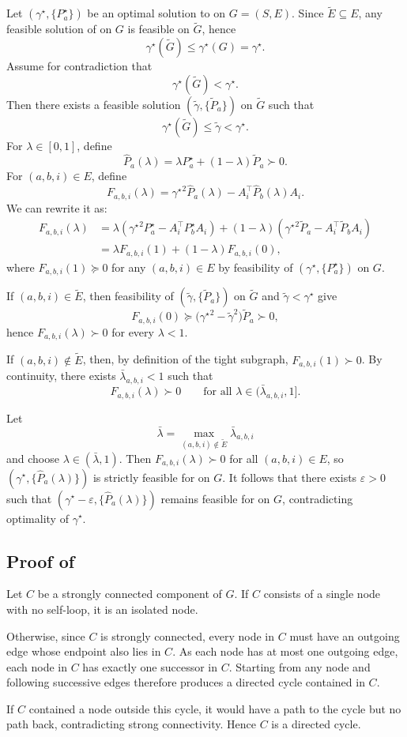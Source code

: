 \documentclass[letterpaper, 10 pt, conference]{ieeeconf}  %
\begin{document}
Let $(\gamma^\star,\{P_a^\star\})$ be an optimal solution to
 on $G=(S,E)$. Since $\tilde E\subseteq E$, any feasible
solution of  on $G$ is feasible on $\tilde G$, hence
\[
\gamma^\star(\tilde G)\leq\gamma^\star(G)=\gamma^\star.
\]
Assume for contradiction that
\[
\gamma^\star(\tilde G)<\gamma^\star.
\]
Then there exists a feasible solution
$(\tilde\gamma,\{\tilde P_a\})$ on $\tilde G$ such that
\[
\gamma^\star(\tilde G)\leq\tilde\gamma<\gamma^\star.
\]
For $\lambda\in[0,1]$, define
\[
\hat P_a(\lambda)=\lambda P_a^\star +(1-\lambda)\tilde P_a \succ 0.
\]
For $(a,b,i)\in E$, define
\[
F_{a,b,i}(\lambda)=
{\gamma^\star}^2 \hat P_a(\lambda)-A_i^\top\hat P_b(\lambda)A_i .
\]
We can rewrite it as:
\begin{align*}
F_{a,b,i}(\lambda)&=\lambda\left({\gamma^\star}^2 P_a^\star-A_i^\top P_b^\star A_i \right)+\left(1-\lambda\right)\left( {\gamma^\star}^2 \tilde P_a-A_i^\top\tilde P_b A_i \right)\\
&=\lambda F_{a,b,i}(1)+(1-\lambda)F_{a,b,i}(0),
\end{align*}
where $F_{a,b,i}(1)
\succeq0$ for any $(a,b,i)\in E$ by feasibility of $(\gamma^\star,\{P_a^\star\})$ on $G$.

If $(a,b,i)\in\tilde E$, then feasibility of
$(\tilde\gamma,\{\tilde P_a\})$ on $\tilde G$ and $\tilde\gamma<\gamma^\star$ give
\[
F_{a,b,i}(0)
\succeq
\bigl({\gamma^\star}^2-\tilde\gamma^2\bigr)\tilde P_a
\succ0,
\]
hence $F_{a,b,i}(\lambda)\succ0$ for every $\lambda<1$.

If $(a,b,i)\notin\tilde E$, then, by definition of the tight subgraph,
$F_{a,b,i}(1)\succ0$. By continuity, there exists
$\bar\lambda_{a,b,i}<1$ such that
\[
F_{a,b,i}(\lambda)\succ0
\qquad
\text{for all }\lambda\in(\bar\lambda_{a,b,i},1].
\]

Let
\[
\bar\lambda=
\max_{(a,b,i)\notin\tilde E}\bar\lambda_{a,b,i}
\]
and choose $\lambda\in(\bar\lambda,1)$. Then
$F_{a,b,i}(\lambda)\succ0$ for all $(a,b,i)\in E$, so
$(\gamma^\star,\{\hat P_a(\lambda)\})$ is strictly feasible for
 on $G$. It follows that there exists
$\varepsilon>0$ such that
$(\gamma^\star-\varepsilon,\{\hat P_a(\lambda)\})$ remains feasible for
 on $G$, contradicting optimality of $\gamma^\star$.
\subsection{Proof of } \label{appendix: proof_outgoing_edges_cycle}
Let $C$ be a strongly connected component of $G$. If $C$ consists of a
single node with no self-loop, it is an isolated node.

Otherwise, since $C$ is strongly connected, every node in $C$ must have
an outgoing edge whose endpoint also lies in $C$. As each node has at
most one outgoing edge, each node in $C$ has exactly one successor in
$C$. Starting from any node and following successive edges therefore
produces a directed cycle contained in $C$.

If $C$ contained a node outside this cycle, it would have a path to the
cycle but no path back, contradicting strong connectivity. Hence $C$ is
a directed cycle.
\fi
\end{document}

